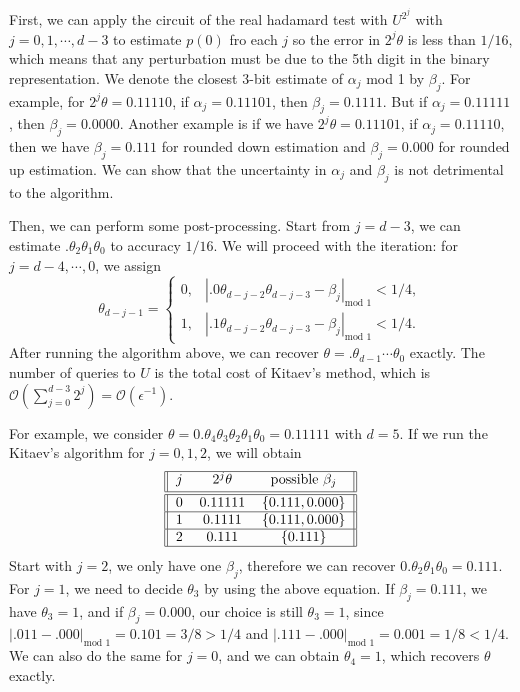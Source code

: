 \documentclass[11pt]{article}
\begin{document}
First, we can apply the circuit of the real hadamard test with $U^{2^j}$ with $j = 0,1,\cdots,d-3$ to estimate $p(0)$ fro each $j$ so the error in $2^j\theta$ is less than $1/16$, which means that any perturbation must be due to the 5th digit in the binary representation. We denote the closest 3-bit estimate of $\alpha_j$ mod 1 by $\beta_j$. For example, for $2^j\theta = 0.11110$, if $\alpha_j = 0.11101$, then $\beta_j = 0.1111$. But if $\alpha_j = 0.11111$, then $\beta_j = 0.0000$. Another example is if we have $2^j\theta = 0.11101$, if $\alpha_j = 0.11110$, then we have $\beta_j = 0.111$ for rounded down estimation and $\beta_j = 0.000$ for rounded up estimation. We can show that the uncertainty in $\alpha_j$ and $\beta_j$ is not detrimental to the algorithm.

Then, we can perform some post-processing. Start from $j = d-3$, we can estimate $.\theta_2\theta_1\theta_0$ to accuracy $1/16$. We will proceed with the iteration: for $j = d-4,\cdots,0$, we assign 
\begin{equation}
    \theta_{d-j-1} = \begin{cases}
        0, & |.0\theta_{d-j-2}\theta_{d-j-3} - \beta_j|_{\text{mod }1} < 1/4, \\
        1, & |.1\theta_{d-j-2}\theta_{d-j-3} - \beta_j|_{\text{mod }1} < 1/4.
    \end{cases}
\end{equation}
After running the algorithm above, we can recover $\theta = .\theta_{d-1}\cdots\theta_0$ exactly. The number of queries to $U$ is the total cost of Kitaev's method, which is $\mathcal{O}(\sum_{j=0}^{d-3}2^j) = \mathcal{O}(\epsilon^{-1})$.

For example, we consider $\theta = 0.\theta_4\theta_3\theta_2\theta_1\theta_0 = 0.11111$ with $d=5$. If we run the Kitaev's algorithm for $j = 0,1,2$, we will obtain 
\begin{equation*}
    \begin{tabular}{||c c c||} 
        \hline
        $j$ & $2^j\theta$ & $\text{possible }\beta_j$ \\ [0.5ex] 
        \hline\hline
        0 & 0.11111 & $\{0.111,0.000\}$  \\ 
        \hline
        1 & 0.1111 & $\{0.111,0.000\}$   \\
        \hline
        2 & 0.111 & $\{0.111\}$   \\
        \hline
        
       \end{tabular}
\end{equation*}
Start with $j = 2$, we only have one $\beta_j$, therefore we can recover $0.\theta_2\theta_1\theta_0 = 0.111$. For $j = 1$, we need to decide $\theta_3$ by using the above equation. If $\beta_j = 0.111$, we have $\theta_3 = 1$, and if $\beta_j = 0.000$, our choice is still $\theta_3 = 1$, since $|.011-.000|_{\text{mod }1} = 0.101 = 3/8 > 1/4$ and $|.111-.000|_{\text{mod }1} = 0.001 = 1/8 < 1/4$. We can also do the same for $j=0$, and we can obtain $\theta_4 = 1$, which recovers $\theta$ exactly.
\end{document}
